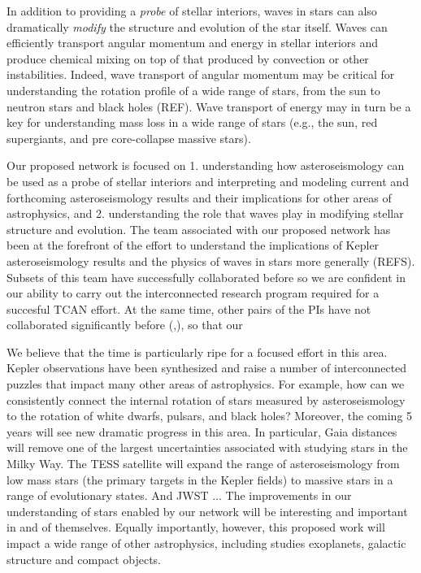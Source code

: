 In addition to providing a {\em probe} of stellar interiors, waves in stars can also dramatically {\em modify} the structure and evolution of the star itself.   Waves can efficiently transport angular momentum and energy in stellar interiors and produce chemical mixing on top of that produced by convection or other instabilities.   Indeed, wave transport of angular momentum may be critical for understanding the rotation profile of a wide range of stars, from the sun to neutron stars and black holes (REF).   Wave transport of energy may in turn be a key for understanding mass loss in a wide range of stars (e.g., the sun, red supergiants, and pre core-collapse massive stars).   

Our proposed network is focused on 1.  understanding how asteroseismology can be used as a probe of stellar interiors and interpreting and modeling current and forthcoming asteroseismology results and their implications for other areas of astrophysics, and 2.  understanding the role that waves play in modifying stellar structure and evolution.  The team associated with our proposed network has been at the forefront of the effort to understand the implications of Kepler asteroseismology results and the physics of waves in stars more generally (REFS).  Subsets of this team have successfully collaborated before so we are confident in our ability to carry out the interconnected research program required for a succesful TCAN effort.  At the same time, other pairs of the PIs have not collaborated significantly before (,), so that our 

We believe that the time is particularly ripe for a focused effort in this area.  Kepler observations have been synthesized and raise a number of interconnected puzzles that impact many other areas of astrophysics.  For example, how can we consistently connect the internal rotation of stars measured by asteroseismology to the rotation of white dwarfs, pulsars, and black holes?   Moreover, the coming 5 years will see new dramatic progress in this area. In particular, Gaia distances will remove one of the largest uncertainties associated with studying stars in the Milky Way.  The TESS satellite will expand the range of asteroseismology from low mass stars (the primary targets in the Kepler fields) to massive stars in a range of evolutionary states.   And JWST ...   The improvements in our understanding of stars enabled by our network will be interesting and important in and of themselves.  Equally importantly, however, this proposed work will impact a wide range of other astrophysics, including studies exoplanets, galactic structure and compact objects.   


